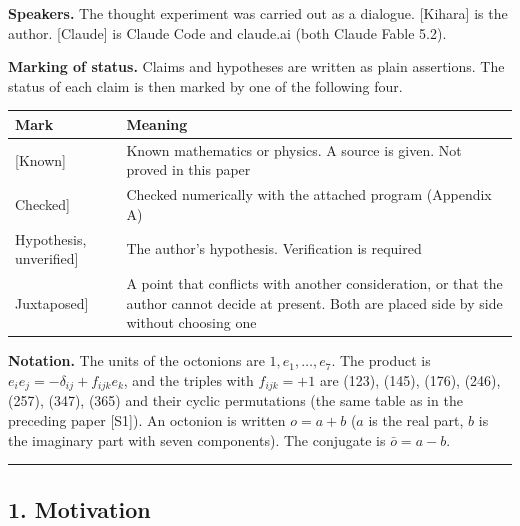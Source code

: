\documentclass[
  a4paper,
]{article}
\newcounter{none} %
\begin{document}
\textbf{Speakers.} The thought experiment was carried out as a dialogue.
{[}Kihara{]} is the author. {[}Claude{]} is Claude Code and claude.ai
(both Claude Fable 5.2).

\textbf{Marking of status.} Claims and hypotheses are written as plain
assertions. The status of each claim is then marked by one of the
following four.

{\def\LTcaptype{none} %
\begin{longtable}[]{@{}
  >{\raggedright\arraybackslash}p{}
  >{\raggedright\arraybackslash}p{}@{}}
\toprule\noalign{}
\begin{minipage}[b]{\linewidth}\raggedright
Mark
\end{minipage} & \begin{minipage}[b]{\linewidth}\raggedright
Meaning
\end{minipage} \\
\midrule\noalign{}
\endhead
\bottomrule\noalign{}
\endlastfoot
{[}Known{]} & Known mathematics or physics. A source is given. Not
proved in this paper \\
{[}Checked{]} & Checked numerically with the attached program (Appendix
A) \\
{[}Hypothesis, unverified{]} & The author's hypothesis. Verification is
required \\
{[}Juxtaposed{]} & A point that conflicts with another consideration, or
that the author cannot decide at present. Both are placed side by side
without choosing one \\
\end{longtable}
}

\textbf{Notation.} The units of the octonions are
\(1, e_1, \dots, e_7\). The product is
\(e_ie_j = -\delta_{ij} + f_{ijk}e_k\), and the triples with
\(f_{ijk} = +1\) are (123), (145), (176), (246), (257), (347), (365) and
their cyclic permutations (the same table as in the preceding paper
{[}S1{]}). An octonion is written \(o = a + b\) (\(a\) is the real part,
\(b\) is the imaginary part with seven components). The conjugate is
\(\bar o = a - b\).

\begin{center}\rule{0.5\linewidth}{0.5pt}\end{center}

\subsection{1. Motivation}\label{motivation}
\end{document}
